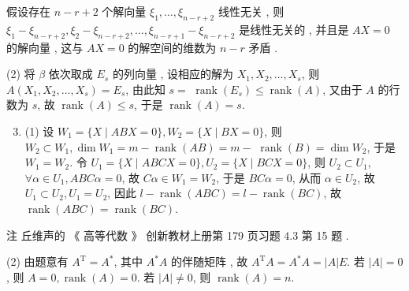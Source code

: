 \documentclass[10pt]{article}
\begin{document}
 假设存在  $n-r+2$  个解向量  $\xi_{1}, \ldots, \xi_{n-r+2}$  线性无关 ,  则  $\xi_{1}-\xi_{n-r+2}, \xi_{2}-\xi_{n-r+2}, \ldots, \xi_{n-r+1}-\xi_{n-r+2}$  是线性无关的 ,  并且是  $A X=0$  的解向量 ,  这与  $A X=0$  的解空间的维数为  $n-r$  矛盾 .

(2)  将  $\beta$  依次取成  $E_{s}$  的列向量 ,  设相应的解为  $X_{1}, X_{2}, \ldots, X_{s}$,  则  $A\left(X_{1}, X_{2}, \ldots, X_{s}\right)=E_{s}$,  由此知  $s=$ $\operatorname{rank}\left(E_{s}\right) \leqslant \operatorname{rank}(A)$,  又由于  $A$  的行数为  $s$,  故  $\operatorname{rank}(A) \leqslant s$,  于是  $\operatorname{rank}(A)=s$.

\begin{enumerate}
  \setcounter{enumi}{2}
  \item (1)  设  $W_{1}=\{X \mid A B X=0\}, W_{2}=\{X \mid B X=0\}$,  则  $W_{2} \subset W_{1}, \operatorname{dim} W_{1}=m-\operatorname{rank}(A B)=m-$ $\operatorname{rank}(B)=\operatorname{dim} W_{2}$,  于是  $W_{1}=W_{2}$.  令  $U_{1}=\{X \mid A B C X=0\}, U_{2}=\{X \mid B C X=0\}$,  则  $U_{2} \subset U_{1}$, $\forall \alpha \in U_{1}, A B C \alpha=0$,  故  $C \alpha \in W_{1}=W_{2}$,  于是  $B C \alpha=0$,  从而  $\alpha \in U_{2}$,  故  $U_{1} \subset U_{2}, U_{1}=U_{2}$,  因此  $l-\operatorname{rank}(A B C)=l-\operatorname{rank}(B C)$,  故  $\operatorname{rank}(A B C)=\operatorname{rank}(B C)$.
\end{enumerate}
 注   丘维声的 《 高等代数 》 创新教材上册第  179  页习题  $4.3$  第  15  题 .

(2)  由题意有  $A^{\mathrm{T}}=A^{*}$,  其中  $A^{*} A$  的伴随矩阵 ,  故  $A^{\mathrm{T}} A=A^{*} A=|A| E$.  若  $|A|=0$,  则  $A=0, \operatorname{rank}(A)=0$.  若  $|A| \neq 0$,  则  $\operatorname{rank}(A)=n$.
\end{document}
